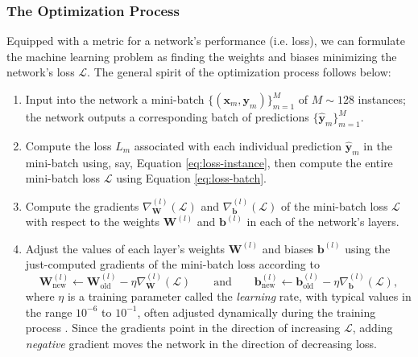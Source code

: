 \documentclass[11pt, a4paper]{article}
\renewcommand{\vec}[1]{\bm{#1}}
\newcommand{\mat}[1]{\mathbf{#1}}
\renewcommand{\grad}{\nabla}
\newcommand{\W}{\mat{W}}
\newcommand{\x}{\vec{x}}
\newcommand{\y}{\vec{y}}
\renewcommand{\b}{\vec{b}}
\begin{document}
\subsubsection{The Optimization Process} \label{sss:optimization}
Equipped with a metric for a network's performance (i.e. loss), we can formulate the machine learning problem as finding the weights and biases minimizing the network's loss $ \mathcal{L} $.
The general spirit of the optimization process follows below:
\begin{enumerate}

    \item \label{item:input} Input into the network a mini-batch $ \big\{(\x_{m}, \y_{m})\big\}_{m = 1}^{M} $ of $ M \sim 128 $ instances; the network outputs a corresponding batch of predictions $ \big\{\hat{\y}_{m}\big\}_{m = 1}^{M} $. %

    \item Compute the loss $ L_{m} $ associated with each individual prediction $ \hat{\y}_{m} $ in the mini-batch using, say, Equation \ref{eq:loss-instance}, then compute the entire mini-batch loss $ \mathcal{L} $ using Equation \ref{eq:loss-batch}.

    \item \label{item:backprop} Compute the  gradients $ \grad^{(l)}_{\W} (\mathcal{L}) $ and $ \grad^{(l)}_{\b} (\mathcal{L}) $ of the mini-batch loss $ \mathcal{L} $ with respect to the weights $ \W^{(l)} $ and $ \b^{(l)} $ in each of the network's layers.

    \item \label{item:update-params} Adjust the values of each layer's weights $ \W^{(l)} $ and biases $ \b^{(l)} $ using the just-computed gradients of the mini-batch loss according to
    \begin{equation*}
        \W^{(l)}_{\text{new}} \leftarrow \W^{(l)}_{\text{old}} - \eta \grad^{(l)}_{\W}(\mathcal{L}) \qquad \text{and} \qquad \b^{(l)}_{\text{new}} \leftarrow \b^{(l)}_{\text{old}} - \eta \grad^{(l)}_{\b}(\mathcal{L}),
    \end{equation*}
    where $ \eta $ is a training parameter called the \textit{learning} rate, with typical values in the range $ 10^{-6} $ to $ 10^{-1} $, often adjusted dynamically during the training process \cite{homl}.
    Since the gradients point in the direction of increasing $ \mathcal{L} $, adding \textit{negative} gradient moves the network in the direction of decreasing loss.


\end{enumerate}
\end{document}
